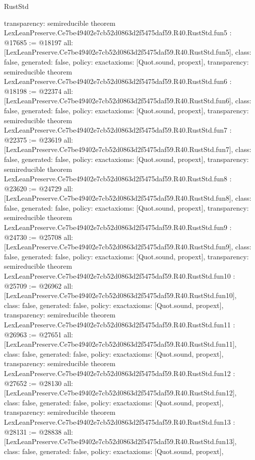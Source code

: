 \begin{lexlean}{RustStd}
\begin{coremodule}
{  transparency: semireducible
}
theorem LexLeanPreserve.Ce7be49402e7cb52d0863d2f5475daf59.R40.RustStd.fun5 : @17685 := @18197 {
  all: [LexLeanPreserve.Ce7be49402e7cb52d0863d2f5475daf59.R40.RustStd.fun5],
  class: false,
  generated: false,
  policy: exact{axioms: [Quot.sound, propext]},
  transparency: semireducible
}
theorem LexLeanPreserve.Ce7be49402e7cb52d0863d2f5475daf59.R40.RustStd.fun6 : @18198 := @22374 {
  all: [LexLeanPreserve.Ce7be49402e7cb52d0863d2f5475daf59.R40.RustStd.fun6],
  class: false,
  generated: false,
  policy: exact{axioms: [Quot.sound, propext]},
  transparency: semireducible
}
theorem LexLeanPreserve.Ce7be49402e7cb52d0863d2f5475daf59.R40.RustStd.fun7 : @22375 := @23619 {
  all: [LexLeanPreserve.Ce7be49402e7cb52d0863d2f5475daf59.R40.RustStd.fun7],
  class: false,
  generated: false,
  policy: exact{axioms: [Quot.sound, propext]},
  transparency: semireducible
}
theorem LexLeanPreserve.Ce7be49402e7cb52d0863d2f5475daf59.R40.RustStd.fun8 : @23620 := @24729 {
  all: [LexLeanPreserve.Ce7be49402e7cb52d0863d2f5475daf59.R40.RustStd.fun8],
  class: false,
  generated: false,
  policy: exact{axioms: [Quot.sound, propext]},
  transparency: semireducible
}
theorem LexLeanPreserve.Ce7be49402e7cb52d0863d2f5475daf59.R40.RustStd.fun9 : @24730 := @25708 {
  all: [LexLeanPreserve.Ce7be49402e7cb52d0863d2f5475daf59.R40.RustStd.fun9],
  class: false,
  generated: false,
  policy: exact{axioms: [Quot.sound, propext]},
  transparency: semireducible
}
theorem LexLeanPreserve.Ce7be49402e7cb52d0863d2f5475daf59.R40.RustStd.fun10 : @25709 := @26962 {
  all: [LexLeanPreserve.Ce7be49402e7cb52d0863d2f5475daf59.R40.RustStd.fun10],
  class: false,
  generated: false,
  policy: exact{axioms: [Quot.sound, propext]},
  transparency: semireducible
}
theorem LexLeanPreserve.Ce7be49402e7cb52d0863d2f5475daf59.R40.RustStd.fun11 : @26963 := @27651 {
  all: [LexLeanPreserve.Ce7be49402e7cb52d0863d2f5475daf59.R40.RustStd.fun11],
  class: false,
  generated: false,
  policy: exact{axioms: [Quot.sound, propext]},
  transparency: semireducible
}
theorem LexLeanPreserve.Ce7be49402e7cb52d0863d2f5475daf59.R40.RustStd.fun12 : @27652 := @28130 {
  all: [LexLeanPreserve.Ce7be49402e7cb52d0863d2f5475daf59.R40.RustStd.fun12],
  class: false,
  generated: false,
  policy: exact{axioms: [Quot.sound, propext]},
  transparency: semireducible
}
theorem LexLeanPreserve.Ce7be49402e7cb52d0863d2f5475daf59.R40.RustStd.fun13 : @28131 := @28838 {
  all: [LexLeanPreserve.Ce7be49402e7cb52d0863d2f5475daf59.R40.RustStd.fun13],
  class: false,
  generated: false,
  policy: exact{axioms: [Quot.sound, propext]},
}
\end{coremodule}
\end{lexlean}
